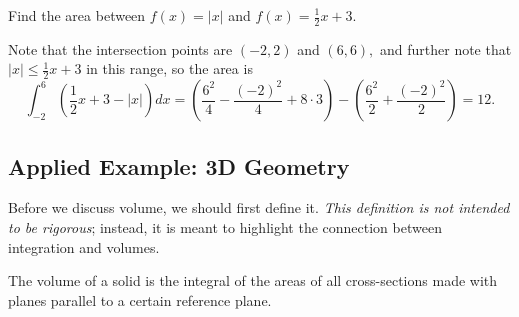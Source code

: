 \documentclass[mast]{lucky}
\begin{document}
\begin{exam}
Find the area between $f(x)=|x|$ and $f(x)=\frac{1}{2}x+3.$
\end{exam}

\begin{sol}
Note that the intersection points are $(-2,2)$ and $(6,6),$ and further note that $|x|\leq \frac{1}{2}x+3$ in this range, so the area is
\[\int_{-2}^6\left(\frac{1}{2}x+3-|x|\right)dx=\left(\frac{6^2}{4}-\frac{(-2)^2}{4}+8\cdot 3\right)-\left(\frac{6^2}{2}+\frac{(-2)^2}{2}\right)=12.\]
\begin{center}

\end{center}

\end{sol}

\subsection{Applied Example: 3D Geometry}

Before we discuss volume, we should first define it. \emph{This definition is not intended to be rigorous}; instead, it is meant to highlight the connection between integration and volumes.

\begin{defi}[Volume]
The volume of a solid is the integral of the areas of all cross-sections made with planes parallel to a certain reference plane.
\end{defi}
\end{document}
